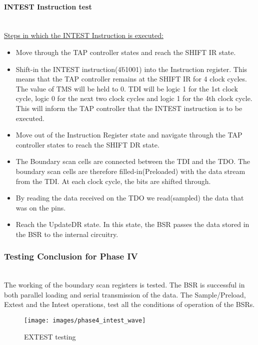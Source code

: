 \documentclass[a4paper,11pt]{article}
\begin{document}
\paragraph{INTEST Instruction test}\mbox{}\\
\underline{Steps in which the INTEST Instruction is executed:}
\begin{itemize}[noitemsep]
\item Move through the TAP controller states and reach the SHIFT IR state.
\item Shift-in the INTEST instruction(4\'b1001) into the Instruction register. This means that the TAP controller remains at the SHIFT IR for 4 clock cycles. The value of TMS will be held to 0. TDI will be logic 1 for the 1st clock cycle, logic 0 for the next two clock cycles and logic 1 for the 4th clock cycle. This will inform the TAP controller that the INTEST instruction is to be executed.
\item Move out of the Instruction Register state and navigate through the TAP controller states to reach the SHIFT DR state.
\item The Boundary scan cells are connected between the TDI and the TDO. The boundary scan cells are therefore filled-in(Preloaded) with the data stream from the TDI. At each clock cycle, the bits are shifted through. 
\item By reading the data received on the TDO we read(sampled) the data that was on the pins.
\item Reach the UpdateDR state. In this state, the BSR passes the data stored in the BSR to the internal circuitry.
\end{itemize}

\FloatBarrier
\subsubsection{Testing Conclusion for Phase IV}
\ \\
The working of the boundary scan registers is tested. The BSR is successful in both parallel loading and serial transmission of the data. The Sample/Preload, Extest and the Intest operations, test all the conditions of operation of the BSRs.




\begin{sidewaysfigure}[ht]
\centering
\texttt{[image: images/phase4\_intest\_wave]}
\caption{EXTEST testing}
\label{fig:LandscapeFigure}
\end{sidewaysfigure}
\newpage
\pagebreak
\FloatBarrier
\end{document}
